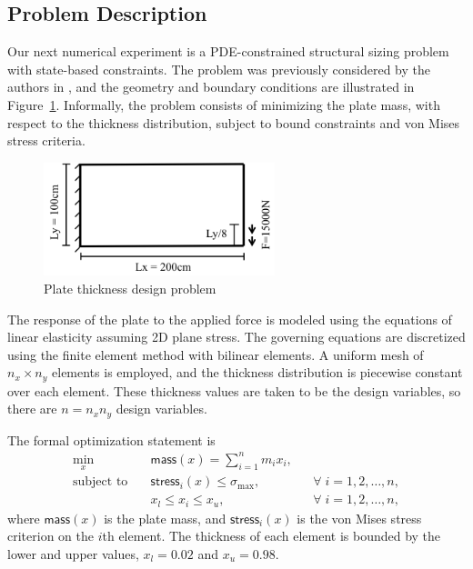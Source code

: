 \subsection{Problem Description}
Our next numerical experiment is a PDE-constrained structural sizing problem
with state-based constraints.  The problem was previously considered by the
authors in \cite{dener:scitech2016}, and the geometry and boundary conditions
are illustrated in Figure~\ref{fig:struct}.  Informally, the problem consists of
minimizing the plate mass, with respect to the thickness distribution, subject
to bound constraints and von Mises stress criteria. 
\begin{figure}[H]
  \centering
  \includegraphics[width=0.6\textwidth]{./figs/chap6_fstopo/struct.png}
  \caption{Plate thickness design problem}
  \label{fig:struct}
\end{figure}

The response of the plate to the applied force is modeled using the equations of
linear elasticity assuming 2D plane stress.  The governing equations are
discretized using the finite element method with bilinear elements.
A uniform mesh of $n_x \times n_y$ elements is employed, and the thickness
distribution is piecewise constant over each element.  These thickness values
are taken to be the design variables, so there are $n = n_x n_y$ design
variables.

The formal optimization statement is
\begin{equation*}
  \begin{alignedat}{2}
    \underset{x}{\text{min}} \quad &\textsf{mass}(x) = \sum_{i=1}^{n} m_i x_i, & &\\
    \text{subject to} \quad &\textsf{stress}_i(x) \leq \sigma_{\max}, &
    &\forall\; i = 1,2,\ldots,n, \\
      & x_l \leq x_i \leq  x_u, \qquad & &\forall\; i = 1,2,\ldots,n,
  \end{alignedat}
\end{equation*}
where $\textsf{mass}(x)$ is the plate mass, and $\textsf{stress}_{i}(x)$ is the
von Mises stress criterion on the $i$th element. The thickness of each element
is bounded by the lower and upper values, $x_l = 0.02$ and $x_u = 0.98$. 

